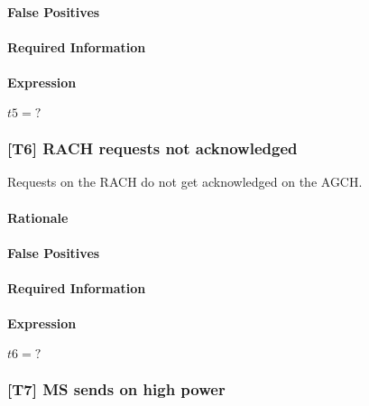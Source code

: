 \documentclass[a4paper,11pt,notitlepage,bigheadings,oneside]{scrartcl}
\begin{document}

\paragraph{False Positives}


\paragraph{Required Information}


\paragraph{Expression}

$t5 = ?$

\subsubsection{[T6] RACH requests not acknowledged}

Requests on the RACH do not get acknowledged on the AGCH.

\paragraph{Rationale}


\paragraph{False Positives}


\paragraph{Required Information}


\paragraph{Expression}

$t6 = ?$

\subsubsection{[T7] MS sends on high power}
\end{document}

